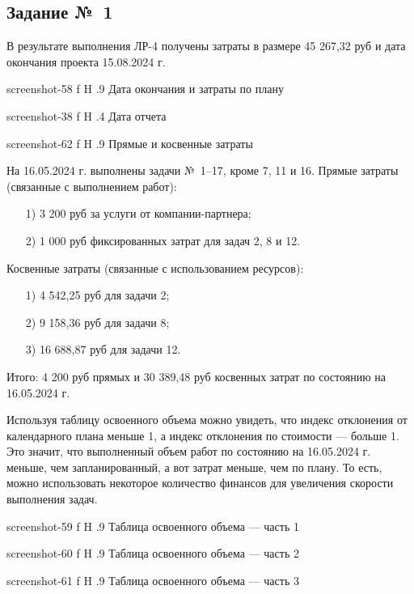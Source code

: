 \documentclass{bmstu}
\begin{document}
\subsection{Задание №~1}

В результате выполнения ЛР-4 получены затраты в размере 45 267,32 руб и дата окончания проекта 15.08.2024 г.

    {screenshot-58}
    {f}
    {H}
    {.9\textwidth}
    {Дата окончания и затраты по плану}
    
    {screenshot-38}
    {f}
    {H}
    {.4\textwidth}
    {Дата отчета}
    
    {screenshot-62}
    {f}
    {H}
    {.9\textwidth}
    {Прямые и косвенные затраты}
    
На 16.05.2024 г. выполнены задачи №~1--17, кроме 7, 11 и 16. 
Прямые затраты (связанные с выполнением работ): 
\begin{enumerate}
\item[1)] 3 200 руб за услуги от компании-партнера;
\item[2)] 1 000 руб фиксированных затрат для задач 2, 8 и 12. 
\end{enumerate}
Косвенные затраты (связанные с использованием ресурсов): 
\begin{enumerate}
\item[1)] 4 542,25 руб для задачи 2;
\item[2)] 9 158,36 руб для задачи 8;
\item[3)] 16 688,87 руб для задачи 12. 
\end{enumerate}

Итого: 4 200 руб прямых и 30 389,48 руб косвенных затрат по состоянию на 16.05.2024 г.

Используя таблицу освоенного объема можно увидеть, что индекс отклонения от календарного плана меньше 1, а индекс отклонения по стоимости --- больше 1. 
Это значит, что выполненный объем работ по состоянию на 16.05.2024 г. меньше, чем запланированный, а вот затрат меньше, чем по плану. 
То есть, можно использовать некоторое количество финансов для увеличения скорости выполнения задач.
    
    {screenshot-59}
    {f}
    {H}
    {.9\textwidth}
    {Таблица освоенного объема --- часть 1}
    
    {screenshot-60}
    {f}
    {H}
    {.9\textwidth}
    {Таблица освоенного объема --- часть 2}
    
    {screenshot-61}
    {f}
    {H}
    {.9\textwidth}
    {Таблица освоенного объема --- часть 3}
    
\end{document}
